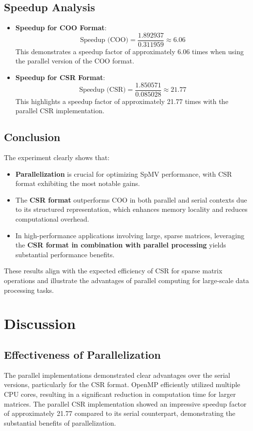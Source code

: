 \documentclass[12pt]{article}
\begin{document}
\subsection{Speedup Analysis}
\begin{itemize}
    \item \textbf{Speedup for COO Format}:
    \begin{equation}
        \text{Speedup (COO)} = \frac{1.892937}{0.311959} \approx 6.06
    \end{equation}
    This demonstrates a speedup factor of approximately 6.06 times when using the parallel version of the COO format.

    \item \textbf{Speedup for CSR Format}:
    \begin{equation}
        \text{Speedup (CSR)} = \frac{1.850571}{0.085028} \approx 21.77
    \end{equation}
    This highlights a speedup factor of approximately 21.77 times with the parallel CSR implementation.
\end{itemize}

\subsection{Conclusion}
The experiment clearly shows that:
\begin{itemize}
    \item \textbf{Parallelization} is crucial for optimizing SpMV performance, with CSR format exhibiting the most notable gains.
    \item The \textbf{CSR format} outperforms COO in both parallel and serial contexts due to its structured representation, which enhances memory locality and reduces computational overhead.
    \item In high-performance applications involving large, sparse matrices, leveraging the \textbf{CSR format in combination with parallel processing} yields substantial performance benefits.
\end{itemize}

These results align with the expected efficiency of CSR for sparse matrix operations and illustrate the advantages of parallel computing for large-scale data processing tasks.

\section{Discussion}

\subsection{Effectiveness of Parallelization}
The parallel implementations demonstrated clear advantages over the serial versions, particularly for the CSR format. OpenMP efficiently utilized multiple CPU cores, resulting in a significant reduction in computation time for larger matrices. The parallel CSR implementation showed an impressive speedup factor of approximately 21.77 compared to its serial counterpart, demonstrating the substantial benefits of parallelization.
\end{document}

